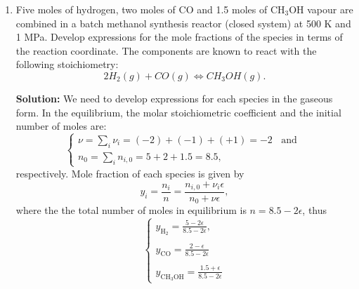 \documentclass[12pts,a4paper,amsmath,amssymb,floatfix]{article}%
\newcommand{\frc}{\displaystyle\frac}
\newcounter{reaction}
\begin{document}
\begin{enumerate}[1)]

\item\label{Example:1} Five moles of hydrogen, two moles of CO and 1.5 moles of CH$_{3}$OH vapour are combined in a batch methanol synthesis reactor (closed system) at 500 K and 1 MPa. Develop expressions for the mole fractions of the species in terms of the reaction coordinate. The components are known to react with the following stoichiometry:
  \begin{displaymath}
      2 H_{2} (g) + CO (g) \Longleftrightarrow CH_{3}OH (g).
  \end{displaymath}

\bigskip

{\bf Solution:} We need to develop expressions for each species in the gaseous form. In the equilibrium, the molar stoichiometric coefficient and the initial number of moles are:
    \begin{displaymath}
       \begin{cases}
         \nu = \sum\limits_{i}\nu_{i}= (-2)+(-1)+(+1)= -2 \;\;\text{ and } \\
         n_{0} = \sum\limits_{i}n_{i,0}= 5 + 2 + 1.5 = 8.5,
       \end{cases}
    \end{displaymath} 
    respectively. Mole fraction of each species is given by
    \begin{displaymath}
          y_{i} = \frc{n_{i}}{n} = \frc{n_{i,0}+\nu_{i}\epsilon}{n_{0}+\nu\epsilon},
    \end{displaymath}
    where the the total number of moles in equilibrium is $n=8.5-2\epsilon$, thus
    \begin{displaymath}
       \begin{cases}
         y_{\text{H}_{2}} = \frc{5-2\epsilon}{8.5-2\epsilon}, \\
         \\
         y_{\text{CO}} = \frc{2-\epsilon}{8.5-2\epsilon}\\
         \\
          y_{\text{CH}_{3}\text{OH}}=\frc{1.5+\epsilon}{8.5-2\epsilon}
       \end{cases}
    \end{displaymath}
\clearpage


\end{enumerate}
\end{document}
